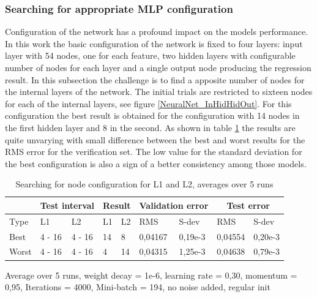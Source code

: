 \subsubsection{Searching for appropriate MLP configuration} \label{sss:tuning_mlp_nodeconfig}
Configuration of the network has a profound impact on the models performance. In this work the basic configuration of the network is fixed to four layers: input layer with 54 nodes, one for each feature, two hidden layers with configurable number of nodes for each layer and a single output node producing the regression result. In this subsection the challenge is to find a apposite number of nodes for the internal layers of the network. The initial trials are restricted to sixteen nodes for each of the internal layers, see figure \ref{NeuralNet_InHidHidOut}. For this configuration the best result is obtained for the configuration with 14 nodes in the first hidden layer and 8 in the second. As shown in table \ref{tab:node_L1_L2_tuning} the results are quite unvarying with small difference between the best and worst results for the RMS error for the verification set. The low value for the standard deviation for the best configuration is also a sign of a better consistency among those models.    
 

\begin{table}[H]
\begin{threeparttable}
\begin{tabular}{ | l | l | l | l | l | l | l | l | l | } 
\hline 
\multicolumn{1}{|c|}{} & \multicolumn{2}{|c|}{Test interval} & \multicolumn{2}{|c|}{Result} & \multicolumn{2}{|c|}{Validation error}  & \multicolumn{2}{|c|}{Test error} \\
\hline 
Type & L1 & L2 & L1 & L2 & RMS & S-dev & RMS & S-dev \\
\hline
Best & 4 - 16 & 4 - 16 & 14 & 8 & 0,04167 & 0,19e-3 & 0,04554 & 0,20e-3 \\ %
\hline
Worst & 4 - 16 & 4 - 16 & 4 & 14 & 0,04315 & 1,25e-3 & 0,04638 & 0,79e-3 \\ %
\hline
\end{tabular}
\begin{tablenotes}
      \small
      \item Average over 5 runs, weight decay = 1e-6, learning rate = 0,30, momentum = 0,95, Iterations = 4000, Mini-batch = 194, no noise added, regular init 
\end{tablenotes}
\caption{Searching for node configuration for L1 and L2, averages over 5 runs}
\label{tab:node_L1_L2_tuning}
\end{threeparttable}
\end{table}


